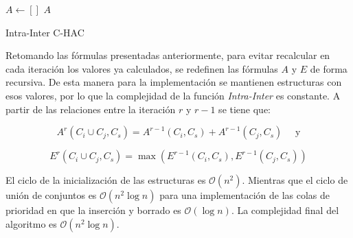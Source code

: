 \begin{center}
	\begin{algorithm}[H]
	\DontPrintSemicolon
	\SetAlgoLined
		$A \leftarrow []$\;
		\Return $A$\;
	\caption{Intra-Inter C-HAC}\label{alg:Intra-Inter C-HAC}
	\end{algorithm}
\end{center}

Retomando las fórmulas presentadas anteriormente, para evitar recalcular en cada iteración los valores ya calculados, se redefinen las fórmulas $A$ y $E$ de forma recursiva. De esta manera para la implementación se mantienen estructuras con esos valores, por lo que la complejidad de la función \textit{Intra-Inter} es constante. A partir de las relaciones entre la iteración $r$ y $r-1$ se tiene que:

$$A^r(C_i \cup C_j, C_s) = A^{r-1}(C_i,C_s) + A^{r-1}(C_j,C_s) \quad \mbox{ y}$$

$$E^r(C_i \cup C_j,C_s) = \max (E^{r-1}(C_i,C_s),E^{r-1}(C_j,C_s))$$

El ciclo de la inicialización de las estructuras es $\mathcal{O}(n^{2})$. Mientras que el ciclo de unión de conjuntos es $\mathcal{O}(n^{2}\log n)$ para una implementación de las colas de prioridad en que la inserción y borrado es $\mathcal{O}(\log n)$. La complejidad final del algoritmo es $\mathcal{O}(n^{2}\log n)$.


